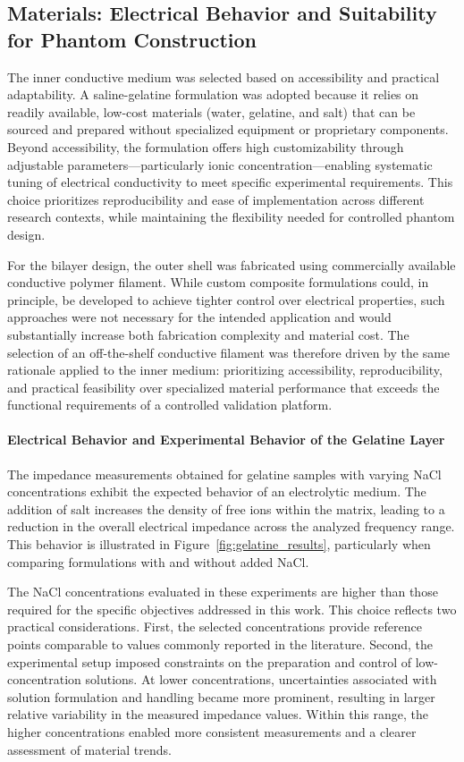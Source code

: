 \documentclass[../00_Main.tex]{subfiles}
\begin{document}
\subsection{Materials: Electrical Behavior and Suitability for Phantom Construction}

The inner conductive medium was selected based on accessibility and practical adaptability. A saline-gelatine formulation was adopted because it relies on readily available, low-cost materials (water, gelatine, and salt) that can be sourced and prepared without specialized equipment or proprietary components. Beyond accessibility, the formulation offers high customizability through adjustable parameters—particularly ionic concentration—enabling systematic tuning of electrical conductivity to meet specific experimental requirements. This choice prioritizes reproducibility and ease of implementation across different research contexts, while maintaining the flexibility needed for controlled phantom design.

For the bilayer design, the outer shell was fabricated using commercially available conductive polymer filament. While custom composite formulations could, in principle, be developed to achieve tighter control over electrical properties, such approaches were not necessary for the intended application and would substantially increase both fabrication complexity and material cost. The selection of an off-the-shelf conductive filament was therefore driven by the same rationale applied to the inner medium: prioritizing accessibility, reproducibility, and practical feasibility over specialized material performance that exceeds the functional requirements of a controlled validation platform.

\paragraph*{Electrical Behavior and Experimental Behavior of the Gelatine Layer}

The impedance measurements obtained for gelatine samples with varying NaCl concentrations
exhibit the expected behavior of an electrolytic medium.
The addition of salt increases the density of free ions within the matrix, leading to a
reduction in the overall electrical impedance across the analyzed frequency range.
This behavior is illustrated in Figure~\ref{fig:gelatine_results}, particularly when
comparing formulations with and without added NaCl.

The NaCl concentrations evaluated in these experiments are higher than those required for
the specific objectives addressed in this work.
This choice reflects two practical considerations.
First, the selected concentrations provide reference points comparable to values commonly
reported in the literature.
Second, the experimental setup imposed constraints on the preparation and control of
low-concentration solutions.
At lower concentrations, uncertainties associated with solution formulation and handling
became more prominent, resulting in larger relative variability in the measured impedance
values.
Within this range, the higher concentrations enabled more consistent measurements and a
clearer assessment of material trends.
\end{document}
